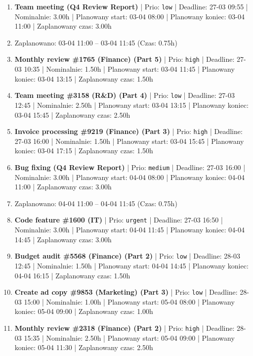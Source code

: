 {\footnotesize
\begin{enumerate}
  \item [\textbf{14682}] \textbf{Team meeting (Q4 Review Report)} | Prio: \texttt{low} | Deadline: 27-03 09:55 | Nominalnie: 3.00h | Planowany start: 03-04 08:00 | Planowany koniec: 03-04 11:00 | Zaplanowany czas: 3.00h
  \item [\textbf{PRZERWA}] Zaplanowano: 03-04 11:00 -- 03-04 11:45 (Czas: 0.75h)
  \item [\textbf{14627}] \textbf{Monthly review \#1765 (Finance) (Part 5)} | Prio: \texttt{high} | Deadline: 27-03 10:35 | Nominalnie: 1.50h | Planowany start: 03-04 11:45 | Planowany koniec: 03-04 13:15 | Zaplanowany czas: 1.50h
  \item [\textbf{14688}] \textbf{Team meeting \#3158 (R\&D) (Part 4)} | Prio: \texttt{low} | Deadline: 27-03 12:45 | Nominalnie: 2.50h | Planowany start: 03-04 13:15 | Planowany koniec: 03-04 15:45 | Zaplanowany czas: 2.50h
  \item [\textbf{14622}] \textbf{Invoice processing \#9219 (Finance) (Part 3)} | Prio: \texttt{high} | Deadline: 27-03 16:00 | Nominalnie: 1.50h | Planowany start: 03-04 15:45 | Planowany koniec: 03-04 17:15 | Zaplanowany czas: 1.50h
  \item [\textbf{14647}] \textbf{Bug fixing (Q4 Review Report)} | Prio: \texttt{medium} | Deadline: 27-03 16:00 | Nominalnie: 3.00h | Planowany start: 04-04 08:00 | Planowany koniec: 04-04 11:00 | Zaplanowany czas: 3.00h
  \item [\textbf{PRZERWA}] Zaplanowano: 04-04 11:00 -- 04-04 11:45 (Czas: 0.75h)
  \item [\textbf{14605}] \textbf{Code feature \#1600 (IT)} | Prio: \texttt{urgent} | Deadline: 27-03 16:50 | Nominalnie: 3.00h | Planowany start: 04-04 11:45 | Planowany koniec: 04-04 14:45 | Zaplanowany czas: 3.00h
  \item [\textbf{14693}] \textbf{Budget audit \#5568 (Finance) (Part 2)} | Prio: \texttt{low} | Deadline: 28-03 12:45 | Nominalnie: 1.50h | Planowany start: 04-04 14:45 | Planowany koniec: 04-04 16:15 | Zaplanowany czas: 1.50h
  \item [\textbf{14679}] \textbf{Create ad copy \#9853 (Marketing) (Part 3)} | Prio: \texttt{low} | Deadline: 28-03 15:00 | Nominalnie: 1.00h | Planowany start: 05-04 08:00 | Planowany koniec: 05-04 09:00 | Zaplanowany czas: 1.00h
  \item [\textbf{14618}] \textbf{Monthly review \#2318 (Finance) (Part 2)} | Prio: \texttt{high} | Deadline: 28-03 15:35 | Nominalnie: 2.50h | Planowany start: 05-04 09:00 | Planowany koniec: 05-04 11:30 | Zaplanowany czas: 2.50h

\end{enumerate}}
